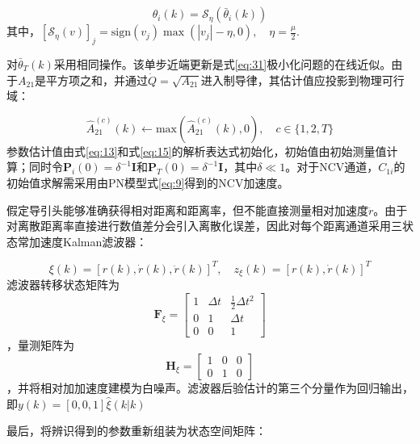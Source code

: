 \begin{equation}
\label{eq:36}
\hat{\theta}_{i}(k) = {\mathcal{S}_\eta }(\bar{\theta}_{i}(k))
\end{equation}
其中，${[{\mathcal{S}_\eta }(v)]_j} = {\text{sign}}({v_j})\max (|{v_j}| - \eta ,0),\quad \eta  = \frac{\mu }{2}$.

对$\bar{\theta}_{T}(k)$采用相同操作。该单步近端更新是式\eqref{eq:31}极小化问题的在线近似。由于${A_{21}}$是平方项之和，并通过$\dot Q = \sqrt {{A_{21}}} $进入制导律，其估计值应投影到物理可行域：

\begin{equation}
\label{eq:37}
\hat A_{21}^{(c)}(k) \leftarrow {\text{max}}(\hat A_{21}^{(c)}(k),0),\quad c \in \{ 1,2,T\}
\end{equation}
参数估计值由式\eqref{eq:13}和式\eqref{eq:15}的解析表达式初始化，初始值由初始测量值计算；同时令${{\mathbf{P}}_i}(0) = {\delta ^{ - 1}}{\mathbf{I}}$和${{\mathbf{P}}_T}(0) = {\delta ^{ - 1}}{\mathbf{I}}$，其中$\delta  \ll 1$。对于NCV通道，${C_{1i}}$的初始值求解需采用由PN模型式\eqref{eq:9}得到的NCV加速度。

假定导引头能够准确获得相对距离和距离率，但不能直接测量相对加速度$\ddot r$。由于对离散距离率直接进行数值差分会引入离散化误差，因此对每个距离通道采用三状态常加速度Kalman滤波器：

\begin{equation}
\label{eq:38}
\xi (k) = {[r(k),\dot r(k),\ddot r(k)]^T},\quad {z_\xi }(k) = {[r(k),\dot r(k)]^T}
\end{equation}
滤波器转移状态矩阵为\[{{\mathbf{F}}_\xi } = \left[ {\begin{array}{*{20}{c}}
  1&{\Delta t}&{\tfrac{1}{2}\Delta {t^2}} \\ 
  0&1&{\Delta t} \\ 
  0&0&1 
\end{array}} \right]\]，量测矩阵为\[{{\mathbf{H}}_\xi } = \begin{bmatrix}
  1 & 0 & 0 \\
  0 & 1 & 0
\end{bmatrix}\]，并将相对加加速度建模为白噪声。滤波器后验估计的第三个分量作为回归输出，即$y(k) = [0,0,1]\hat{\xi}(k|k)$

最后，将辨识得到的参数重新组装为状态空间矩阵：

